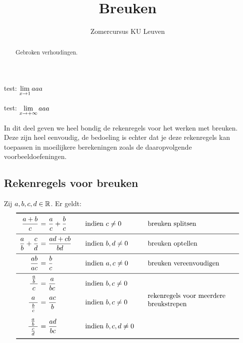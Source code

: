 \documentclass[numbers,wordchoicegiven]{ximera}
\author{Zomercursus KU Leuven}
\title[Rekenvaardigheden:]{Breuken}
\begin{document}
\begin{abstract}
	Gebroken verhoudingen.
\end{abstract}
\maketitle

test: $\limxg{1} aaa$

test: $\limxi aaa$


In dit deel geven we heel bondig de rekenregels voor het werken
met breuken. Deze zijn heel eenvoudig, de bedoeling is echter dat
je deze rekenregels kan toepassen in moeilijkere berekeningen
zoals de daaropvolgende voorbeeldoefeningen.

\subsection{Rekenregels voor breuken}
\begin{proposition}
Zij $a,b,c,d\in \mathbb{R}$. Er geldt:
\[
\begin{array}{r@{\ }c@{\ }l@{\qquad}l@{\qquad}l}
\specialrule{.1em}{0ex}{1ex}
\ds{\frac{a+b}{c}}&=&\ds{\frac{a}{c}+\frac{b}{c}}&\textrm{indien }c \neq 0&\textrm{breuken splitsen}\\
\addlinespace[.7ex]
\midrule
\addlinespace[.7ex]
\ds{\frac{a}{b}+\frac{c}{d}}&=&\ds{\frac{ad+cb}{bd}}&\textrm{indien }b,d \neq 0&\textrm{breuken optellen}\\
\addlinespace[.7ex]
\midrule
\addlinespace[.7ex]
\ds{\frac{ab}{ac}}&=&\ds{\frac{b}{c}}&\textrm{indien }a,c \neq 0&\textrm{breuken vereenvoudigen}\\
\addlinespace[.7ex]
\midrule
\addlinespace[.7ex]
\ds{\frac{\frac{a}{b}}{\ c\ }}&=&\ds{\frac{a}{bc}}&\textrm{indien }b,c \neq 0&\multirow{5}{4.5cm}{\textrm{rekenregels voor meerdere breukstrepen}}\\\addlinespace[2.2ex]
\ds{\frac{a}{\ \frac{b}{c}\ }}&=&\ds{\frac{ac}{b}}&\textrm{indien }b,c \neq 0&\\\addlinespace[2.2ex]
\ds{\frac{\frac{a}{b}}{\ \frac{c}{d}\ }}&=&\ds{\frac{ad}{bc}}&\textrm{indien }b,c,d \neq 0&\\
\specialrule{.1em}{1ex}{0ex}
\end{array}
\]
\end{proposition}
\end{document}
